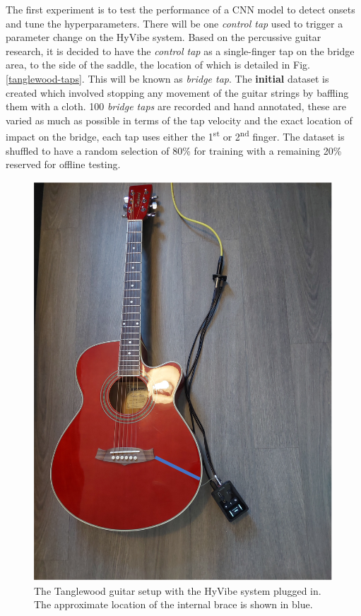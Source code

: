 \documentclass[conference]{IEEEtran}
\begin{document}
The first experiment is to test the performance of a CNN model to detect onsets and tune the hyperparameters. There will be one \emph{control tap} used to trigger a parameter change on the HyVibe system. Based on the percussive guitar research, it is decided to have the \emph{control tap} as a single-finger tap on the bridge area, to the side of
the saddle, the location of which is detailed in Fig. \ref{tanglewood-taps}. This will be known as \emph{bridge tap}. The \textbf{initial} dataset is created which involved stopping any movement of the guitar strings by baffling them with a cloth. 100 \emph{bridge taps} are recorded and hand annotated, these are varied as much as possible
in terms of the tap velocity and the exact location of impact on the bridge, each tap uses either the 1\textsuperscript{st} or 2\textsuperscript{nd} finger. The dataset is shuffled to have a random selection of 80\% for training with a remaining 20\% reserved for offline testing. 

\begin{figure}[htbp]
    \centerline{\includegraphics[scale=0.4]{tanglewood-setup.png}}
    \caption{The Tanglewood guitar setup with the HyVibe system plugged in. The approximate location of the internal brace is shown in blue.}
    \label{tanglewood-setup}
    \end{figure}
\end{document}
